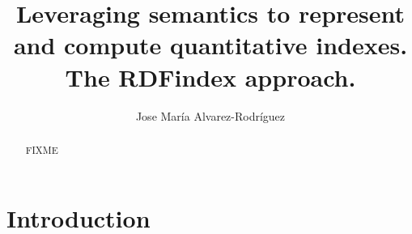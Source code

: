\documentclass{llncs}
\begin{document}
\title{Leveraging semantics to represent and compute quantitative indexes. \\ The RDFindex approach.}

\titlerunning{}

\author{Jose Mar\'{i}a Alvarez-Rodr\'{i}guez} 







\date{}

\maketitle

\renewcommand{\labelitemi}{$\bullet$}

\begin{abstract}
FIXME
\end{abstract}

\section{Introduction}
\end{document}
